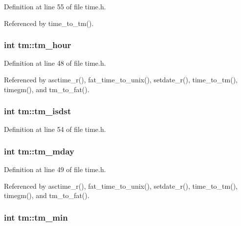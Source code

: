 Definition at line 55 of file time.\-h.



Referenced by time\-\_\-to\-\_\-tm().

\hypertarget{structtm_a3e7ca4e37f1abcaf56b8a916c38eb9fe}{
\subsubsection[{tm\-\_\-hour}]{\setlength{\rightskip}{0pt plus 5cm}int tm\-::tm\-\_\-hour}}\label{structtm_a3e7ca4e37f1abcaf56b8a916c38eb9fe}


Definition at line 48 of file time.\-h.



Referenced by asctime\-\_\-r(), fat\-\_\-time\-\_\-to\-\_\-unix(), setdate\-\_\-r(), time\-\_\-to\-\_\-tm(), timegm(), and tm\-\_\-to\-\_\-fat().

\hypertarget{structtm_a5645ca0580c8ab2c24f6c2965d9c9f9c}{
\subsubsection[{tm\-\_\-isdst}]{\setlength{\rightskip}{0pt plus 5cm}int tm\-::tm\-\_\-isdst}}\label{structtm_a5645ca0580c8ab2c24f6c2965d9c9f9c}


Definition at line 54 of file time.\-h.

\hypertarget{structtm_ab8d8904bad43b0c8b96e61941c5b5310}{
\subsubsection[{tm\-\_\-mday}]{\setlength{\rightskip}{0pt plus 5cm}int tm\-::tm\-\_\-mday}}\label{structtm_ab8d8904bad43b0c8b96e61941c5b5310}


Definition at line 49 of file time.\-h.



Referenced by asctime\-\_\-r(), fat\-\_\-time\-\_\-to\-\_\-unix(), setdate\-\_\-r(), time\-\_\-to\-\_\-tm(), timegm(), and tm\-\_\-to\-\_\-fat().

\hypertarget{structtm_af414eb7c86cc3099595211eee4d4211b}{
\subsubsection[{tm\-\_\-min}]{\setlength{\rightskip}{0pt plus 5cm}int tm\-::tm\-\_\-min}}\label{structtm_af414eb7c86cc3099595211eee4d4211b}


